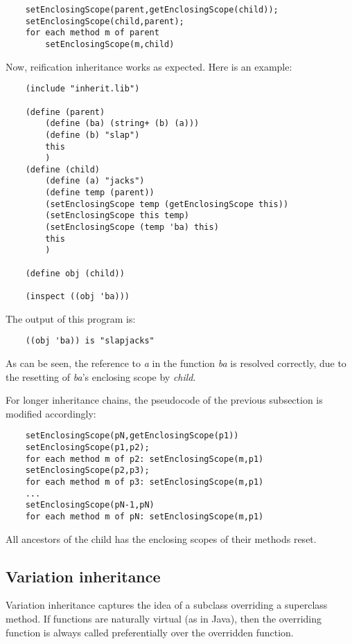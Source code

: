 \begin{verbatim}
    setEnclosingScope(parent,getEnclosingScope(child));
    setEnclosingScope(child,parent);
    for each method m of parent
        setEnclosingScope(m,child)
\end{verbatim}

Now, reification inheritance works as expected. Here is an example:

\begin{verbatim}
    (include "inherit.lib")

    (define (parent)
        (define (ba) (string+ (b) (a)))
        (define (b) "slap")
        this
        )
    (define (child)
        (define (a) "jacks")
        (define temp (parent))
        (setEnclosingScope temp (getEnclosingScope this))
        (setEnclosingScope this temp)
        (setEnclosingScope (temp 'ba) this)
        this
        )

    (define obj (child))

    (inspect ((obj 'ba)))
\end{verbatim}

The output of this program is:

\begin{verbatim}
    ((obj 'ba)) is "slapjacks"
\end{verbatim}

As can be seen, the reference to {\it a} in the function {\it ba} is
resolved correctly, due to the resetting of {\it ba}'s enclosing scope
by {\it child}.

For longer inheritance chains, the pseudocode of the previous subsection
is modified accordingly:

\begin{verbatim}
    setEnclosingScope(pN,getEnclosingScope(p1))
    setEnclosingScope(p1,p2);
    for each method m of p2: setEnclosingScope(m,p1)
    setEnclosingScope(p2,p3);
    for each method m of p3: setEnclosingScope(m,p1)
    ...
    setEnclosingScope(pN-1,pN)
    for each method m of pN: setEnclosingScope(m,p1)
\end{verbatim}

All ancestors of the child has the enclosing scopes of their methods reset.

\subsection{Variation inheritance}

Variation inheritance captures the idea of a subclass overriding a
superclass method. If functions are naturally virtual (as in Java),
then the overriding function is always called preferentially over the
overridden function.

